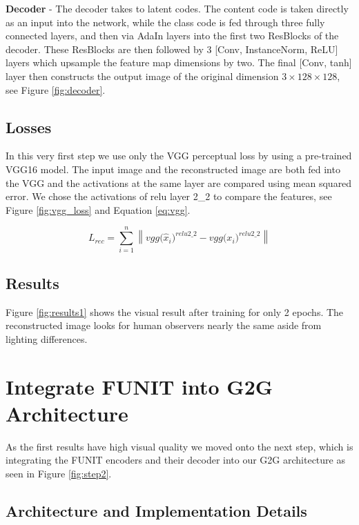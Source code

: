 \documentclass{article}
\begin{document}
\begin{multicols}{2}
\textbf{Decoder} - The decoder takes to latent codes. The content code is taken directly as an input into the network, while the class code is fed through three fully connected layers, and then via AdaIn layers into the first two ResBlocks of the decoder. These ResBlocks are then followed by 3 [Conv, InstanceNorm, ReLU] layers which upsample the feature map dimensions by two. The final [Conv, tanh] layer then constructs the output image of the original dimension $3 \times 128 \times 128$, see Figure \ref{fig:decoder}.

\subsection{Losses}
In this very first step we use only the VGG perceptual loss by using a pre-trained VGG16 model. The input image and the reconstructed image are both fed into the VGG and the activations at the same layer are compared using mean squared error.
We chose the activations of relu layer 2\_2 to compare the features, see Figure \ref{fig:vgg_loss} and Equation \ref{eq:vgg}.

\begin{equation}
	L_{rec} = \sum_{i=1}^{n} \left\| vgg \big( \hat{x}_i \big)^{relu2\_2} - vgg \big( {x}_i \big)^{relu2\_2} \right\| 
	\label{eq:vgg}
\end{equation}

\subsection{Results}

Figure \ref{fig:results1} shows the visual result after training for only 2 epochs. The reconstructed image looks for human observers nearly the same aside from lighting differences.

\section{Integrate FUNIT into G2G Architecture}

As the first results have high visual quality we moved onto the next step, which is integrating the FUNIT encoders and their decoder into our G2G architecture as seen in Figure \ref{fig:step2}.

\subsection{Architecture and Implementation Details}


\end{multicols}
\end{document}
